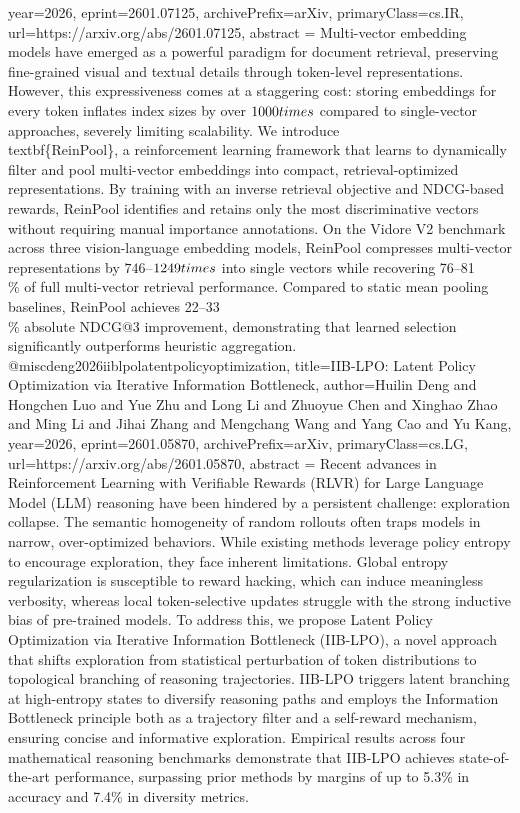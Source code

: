 {      year={2026},
      eprint={2601.07125},
      archivePrefix={arXiv},
      primaryClass={cs.IR},
      url={https://arxiv.org/abs/2601.07125},
      abstract = {Multi-vector embedding models have emerged as a powerful paradigm for document retrieval, preserving fine-grained visual and textual details through token-level representations. However, this expressiveness comes at a staggering cost: storing embeddings for every token inflates index sizes by over $1000\\times$ compared to single-vector approaches, severely limiting scalability. We introduce \\textbf\{ReinPool\}, a reinforcement learning framework that learns to dynamically filter and pool multi-vector embeddings into compact, retrieval-optimized representations. By training with an inverse retrieval objective and NDCG-based rewards, ReinPool identifies and retains only the most discriminative vectors without requiring manual importance annotations. On the Vidore V2 benchmark across three vision-language embedding models, ReinPool compresses multi-vector representations by $746$--$1249\\times$ into single vectors while recovering 76--81\\\% of full multi-vector retrieval performance. Compared to static mean pooling baselines, ReinPool achieves 22--33\\\% absolute NDCG@3 improvement, demonstrating that learned selection significantly outperforms heuristic aggregation.}
}@misc{deng2026iiblpolatentpolicyoptimization,
      title={IIB-LPO: Latent Policy Optimization via Iterative Information Bottleneck}, 
      author={Huilin Deng and Hongchen Luo and Yue Zhu and Long Li and Zhuoyue Chen and Xinghao Zhao and Ming Li and Jihai Zhang and Mengchang Wang and Yang Cao and Yu Kang},
      year={2026},
      eprint={2601.05870},
      archivePrefix={arXiv},
      primaryClass={cs.LG},
      url={https://arxiv.org/abs/2601.05870},
      abstract = {Recent advances in Reinforcement Learning with Verifiable Rewards (RLVR) for Large Language Model (LLM) reasoning have been hindered by a persistent challenge: exploration collapse. The semantic homogeneity of random rollouts often traps models in narrow, over-optimized behaviors. While existing methods leverage policy entropy to encourage exploration, they face inherent limitations. Global entropy regularization is susceptible to reward hacking, which can induce meaningless verbosity, whereas local token-selective updates struggle with the strong inductive bias of pre-trained models. To address this, we propose Latent Policy Optimization via Iterative Information Bottleneck (IIB-LPO), a novel approach that shifts exploration from statistical perturbation of token distributions to topological branching of reasoning trajectories. IIB-LPO triggers latent branching at high-entropy states to diversify reasoning paths and employs the Information Bottleneck principle both as a trajectory filter and a self-reward mechanism, ensuring concise and informative exploration. Empirical results across four mathematical reasoning benchmarks demonstrate that IIB-LPO achieves state-of-the-art performance, surpassing prior methods by margins of up to 5.3\% in accuracy and 7.4\% in diversity metrics.}
}
